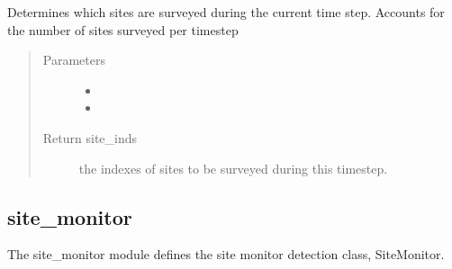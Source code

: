 \documentclass[letterpaper,10pt,english]{sphinxmanual}
\begin{document}
\begin{fulllineitems}
\begin{fulllineitems}
\end{fulllineitems}


\begin{fulllineitems}
\label{\detokenize{index:feast.DetectionModules.site_survey.SiteSurvey.sites_surveyed}}
Determines which sites are surveyed during the current time step.
Accounts for the number of sites surveyed per timestep
\begin{quote}\begin{description}
\item[{Parameters}] \leavevmode\begin{itemize}
\item {} 
 \textendash{} 

\item {} 
 \textendash{} 

\end{itemize}

\item[{Return site\_inds}] \leavevmode
the indexes of sites to be surveyed during this timestep.

\end{description}\end{quote}

\end{fulllineitems}


\end{fulllineitems}



\subsection{site\_monitor}
\label{\detokenize{index:module-feast.DetectionModules.site_monitor}}\label{\detokenize{index:site-monitor}}
The site\_monitor module defines the site monitor detection class, SiteMonitor.
\end{document}

